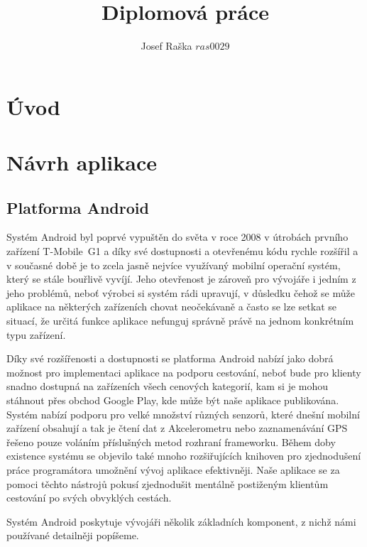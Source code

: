 \documentclass{article}
\title{Diplomová práce}
\author{Josef Raška \(ras0029\)}
\begin{document}
{}

\tableofcontents
\listoffigures
\listoftables

\newpage

\section{Úvod}

\section{Návrh aplikace}
\subsection{Platforma Android}
Systém Android byl poprvé vypuštěn do světa v roce 2008 v útrobách prvního zařízení T-Mobile~G1\cite{androidcentral}
a díky své dostupnosti a otevřenému kódu rychle rozšířil a v současné době je to zcela jasně nejvíce využívaný mobilní
operační systém, který se stále bouřlivě vyvíjí. Jeho otevřenost je zároveň pro vývojáře i jedním z jeho problémů,
neboť výrobci si systém rádi upravují, v důsledku čehož se může aplikace na některých zařízeních chovat
neočekávaně a často se lze setkat se situací, že určitá funkce aplikace nefunguj správně právě na
jednom konkrétním typu zařízení.

Díky své rozšířenosti a dostupnosti se platforma Android nabízí jako dobrá možnost pro implementaci
aplikace na podporu cestování, neboť bude pro klienty snadno dostupná na zařízeních všech cenových
kategorií, kam si je mohou stáhnout přes obchod Google Play, kde může být naše aplikace publikována.
Systém nabízí podporu pro velké množství různých senzorů, které dnešní mobilní zařízení obsahují
a tak je čtení dat z Akcelerometru nebo zaznamenávání GPS řešeno pouze voláním příslušných metod
rozhraní frameworku. Během doby existence systému se objevilo také mnoho rozšiřujících knihoven
pro zjednodušení práce programátora umožnění vývoj aplikace efektivněji. Naše aplikace se
za pomoci těchto nástrojů pokusí zjednodušit mentálně postiženým klientům cestování po svých
obvyklých cestách.

Systém Android poskytuje vývojáři několik základních komponent, z nichž námi používané detailněji popíšeme.
\end{document}
